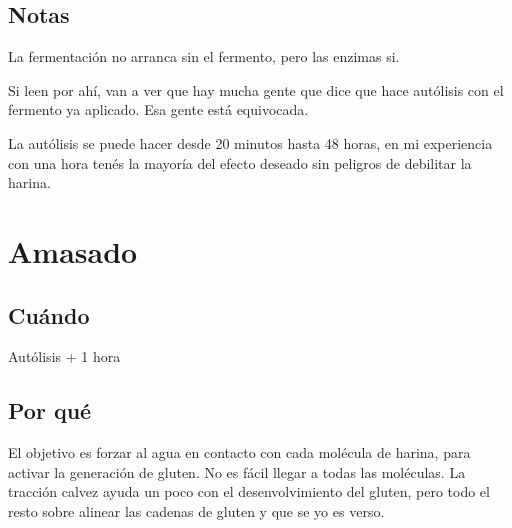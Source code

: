 \documentclass[10pt,a4paper]{article}
\begin{document}
\subsection*{Notas}
La fermentación no arranca sin el fermento, pero las enzimas si.

Si leen por ahí, van a ver que hay mucha gente que dice que hace autólisis con
el fermento ya aplicado. Esa gente está equivocada.

  La autólisis se puede hacer desde 20 minutos hasta 48 horas, en mi
  experiencia con una hora tenés la mayoría del efecto deseado sin
  peligros de debilitar la harina.

\section{Amasado}
\subsection*{Cuándo}
  Autólisis + 1 hora

\subsection*{Por qué}
El objetivo es forzar al agua en contacto con cada molécula
de harina, para activar la generación de gluten. No es fácil
llegar a todas las moléculas. La tracción calvez ayuda un poco
con el desenvolvimiento del gluten, pero todo el resto sobre alinear
las cadenas de gluten y que se yo es verso.
\end{document}

